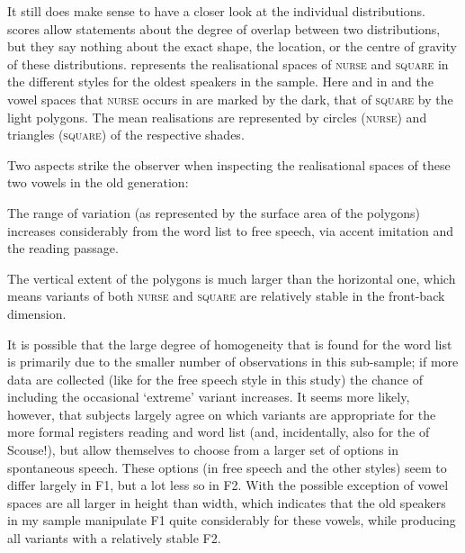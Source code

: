 It still does make sense to have a closer look at the individual distributions.
 scores allow statements about the degree of overlap between two distributions, but they say nothing about the exact shape, the location, or the centre of gravity of these distributions.
 represents the realisational spaces of \textsc{nurse} and \textsc{square} in the different styles for the oldest speakers in the sample.
Here and in  and  the vowel spaces that \textsc{nurse} occurs in are marked by the dark, that of \textsc{square} by the light polygons.
The mean realisations are represented by circles (\textsc{nurse}) and triangles (\textsc{square}) of the respective shades.

Two aspects strike the observer when inspecting the realisational spaces of these two vowels in the old generation:
\begin{inparaenum}[(1)]
	\item The range of variation (as represented by the surface area of the polygons) increases considerably from the word list to free speech, via accent imitation and the reading passage.
	\item The vertical extent of the polygons is much larger than the horizontal one, which means variants of both \textsc{nurse} and \textsc{square} are relatively stable in the front-back dimension.
\end{inparaenum}
It is possible that the large degree of homogeneity that is found for the word list is primarily due to the smaller number of observations in this sub-sample; if more data are collected (like for the free speech style in this study) the chance of including the occasional `extreme' variant increases.
It seems more likely, however, that subjects largely agree on which variants are appropriate for the more formal registers reading and word list (and, incidentally, also for the  of Scouse!), but allow themselves to choose from a larger set of options in spontaneous speech.
These options (in free speech and the other styles) seem to differ largely in F1, but a lot less so in F2.
With the possible exception of  vowel spaces are all larger in height than width, which indicates that the old speakers in my sample manipulate F1 quite considerably for these vowels, while producing all variants with a relatively stable F2.


